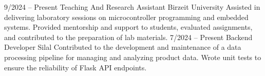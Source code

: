 \documentclass[9pt]{developercv} %
\begin{document}
\begin{entrylist}

    \entry
    {9/2024 -- Present}
    {Teaching And Research Assistant}
    {Birzeit University}
    {
        Assisted in delivering laboratory sessions on microcontroller programming and embedded systems. Provided mentorship and support to students, evaluated assignments, and contributed to the preparation of lab materials.
    }
    \entry
        {7/2024 -- Present}
        {Backend Developer}
        {Silal}
        { Contributed to the development and maintenance of a data processing pipeline for managing and analyzing product data. Wrote unit tests to ensure the reliability of Flask API endpoints.}
    

\end{entrylist}
\end{document}
